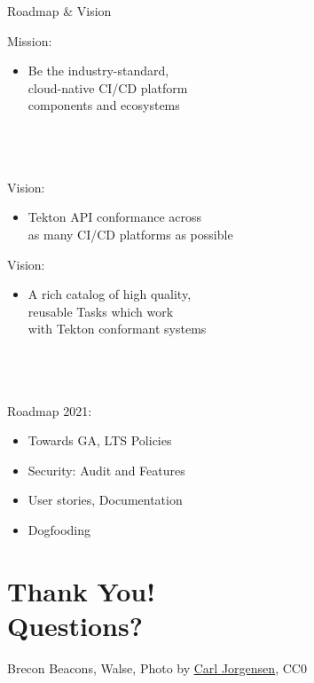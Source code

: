 \documentclass[aspectratio=169,11pt,hyperref={colorlinks=true}]{beamer}
\begin{document}
\begin{2columnsframe}{Roadmap \& Vision}%
  {%
  Mission:
  \begin{itemize}
    \item Be the industry-standard,\\
          cloud-native CI/CD platform \\
          components and ecosystems \\
  \end{itemize}
  ~\\
  ~\\
  \tiny~\\
  \normalsize
  Vision:
  \begin{itemize}
    \item Tekton API conformance across\\
          as many CI/CD platforms as possible
  \end{itemize}
  }{%
  Vision:
  \begin{itemize}
    \item A rich catalog of high quality,\\
          reusable Tasks which work\\
          with Tekton conformant systems\\
  \end{itemize}
  ~\\
  ~\\
  \tiny~\\
  \normalsize
  Roadmap 2021:
  \begin{itemize}
    \item Towards GA, LTS Policies
    \item Security: Audit and Features
    \item User stories, Documentation
    \item Dogfooding
  \end{itemize}
  }
\end{2columnsframe}

\section[Q\&A]{Thank You! \\Questions?}

\begin{sectionwithpiclargecentral}{Brecon Beacons, Walse, Photo by \href{https://unsplash.com/@scamartist}{\underline{Carl Jorgensen}}, CC0}
\end{sectionwithpiclargecentral}
\end{document}
